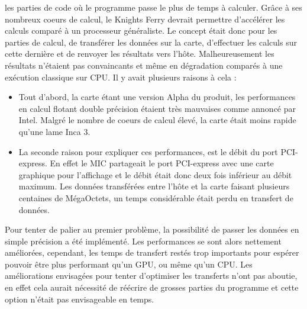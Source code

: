 \documentclass{article}
\begin{document}
					les parties de code où le programme passe le plus de temps à calculer. Grâce à ses nombreux coeurs de calcul, 
					le Knights Ferry devrait permettre d'accélérer les calculs comparé à un processeur généraliste. Le concept 
					était donc pour les parties de calcul, de transférer les données sur la carte, d'effectuer les calculs sur 
					cette dernière et de renvoyer les résultats vers l'hôte. Malheureusement les résultats n'étaient pas 
					convaincants et même en dégradation comparés à une exécution classique sur CPU. Il y avait plusieurs raisons 
					à cela : \newline
					\begin{itemize}
					\item Tout d'abord, la carte étant une version Alpha du produit, les performances en calcul flotant 
					double précision étaient très mauvaises comme annoncé par Intel. Malgré le nombre de coeurs de calcul 
					élevé, la carte était moins rapide qu'une lame Inca 3.
					\item La seconde raison pour expliquer ces performances, est le débit du port PCI-express. En effet le MIC 
					partageait le port PCI-express avec une carte graphique pour l'affichage et le débit était donc deux fois 
					inférieur au débit maximum. Les données transférées entre l'hôte et la carte faisant plusieurs 
					centaines de MégaOctets, un temps considérable était perdu en transfert de données. \newline
					\end{itemize}
					Pour tenter de palier au premier problème, la possibilité de passer les données en simple précision a été 
					implémenté. Les performances se sont alors nettement améliorées, cependant, les temps de transfert restés trop 
					importants pour espérer pouvoir être plus performant qu'un GPU, ou même qu'un CPU. \newline
					Les améliorations envisagées pour tenter d'optimiser les transferts n'ont pas aboutie, en effet cela aurait 
					nécessité de réécrire de grosses parties du programme et cette option n'était pas envisageable en temps.
\end{document}
